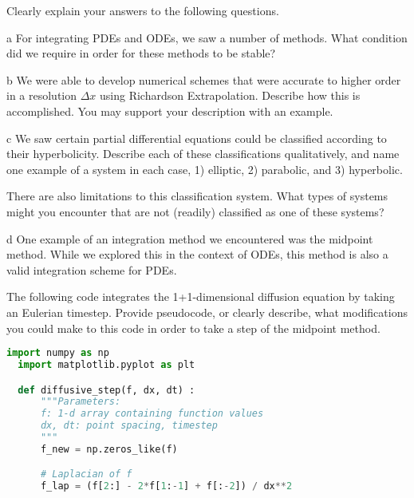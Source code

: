 \documentclass[]{homework}
\begin{document}
\begin{problem}{2}
  Clearly explain your answers to the following questions.
  \begin{subproblem}{a}
    For integrating PDEs and ODEs, we saw a number of methods.
    What condition did we require in order for these methods to
    be stable? 
  \end{subproblem}
  \begin{subproblem}{b}
    We were able to develop numerical schemes that were
    accurate to higher order in a resolution $\Delta x$ using
    Richardson Extrapolation. Describe how this is accomplished.
    You may support your description with an example.
  \end{subproblem}
  \begin{subproblem}{c}
    We saw certain partial differential equations could be
    classified according to their hyperbolicity. Describe each of
    these classifications qualitatively, and name one example of a
    system in each case,
    1) elliptic, 2) parabolic, and 3) hyperbolic.

    There are also limitations to this classification system.
    What types of systems might you encounter that are not (readily)
    classified as one of these systems?
  \end{subproblem}
  \begin{subproblem}{d}
    One example of an integration method we encountered was the 
    midpoint method. While we explored this in the context of ODEs,
    this method is also a valid integration scheme for PDEs. 

    The following code integrates the 1+1-dimensional diffusion
    equation by taking an Eulerian timestep. Provide pseudocode, or
    clearly describe, what modifications you could make
    to this code in order to take a step of the midpoint method.


\begin{lstlisting}[language=Python]
  import numpy as np
  import matplotlib.pyplot as plt

  def diffusive_step(f, dx, dt) :
      """Parameters:
      f: 1-d array containing function values
      dx, dt: point spacing, timestep
      """
      f_new = np.zeros_like(f)

      # Laplacian of f
      f_lap = (f[2:] - 2*f[1:-1] + f[:-2]) / dx**2
      

\end{lstlisting}
\end{subproblem}
\end{problem}
\end{document}
